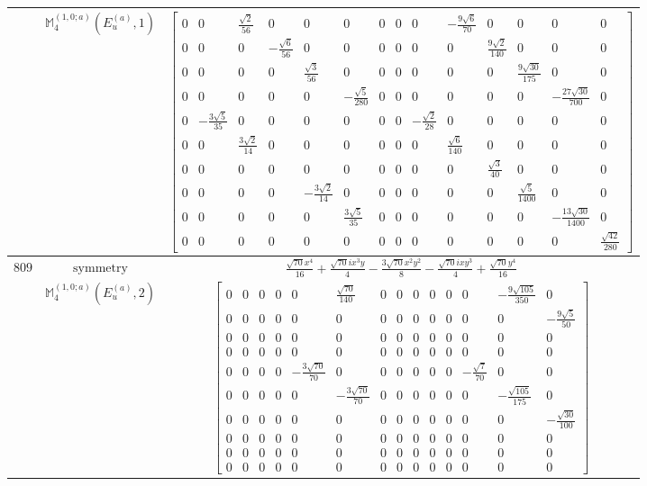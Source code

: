 \documentclass[fleqn,8pt,landscape]{jsarticle}
\begin{document}
\begin{longtable}{ccc}
$  $ & $ \mathbb{M}_{4}^{(1,0;a)}(E_{u}^{(a)},1) $ & $ \begin{bmatrix} 0 & 0 & \frac{\sqrt{2}}{56} & 0 & 0 & 0 & 0 & 0 & 0 & - \frac{9 \sqrt{6}}{70} & 0 & 0 & 0 & 0 \\ 0 & 0 & 0 & - \frac{\sqrt{6}}{56} & 0 & 0 & 0 & 0 & 0 & 0 & \frac{9 \sqrt{2}}{140} & 0 & 0 & 0 \\ 0 & 0 & 0 & 0 & \frac{\sqrt{3}}{56} & 0 & 0 & 0 & 0 & 0 & 0 & \frac{9 \sqrt{30}}{175} & 0 & 0 \\ 0 & 0 & 0 & 0 & 0 & - \frac{\sqrt{5}}{280} & 0 & 0 & 0 & 0 & 0 & 0 & - \frac{27 \sqrt{30}}{700} & 0 \\ 0 & - \frac{3 \sqrt{5}}{35} & 0 & 0 & 0 & 0 & 0 & 0 & - \frac{\sqrt{2}}{28} & 0 & 0 & 0 & 0 & 0 \\ 0 & 0 & \frac{3 \sqrt{2}}{14} & 0 & 0 & 0 & 0 & 0 & 0 & \frac{\sqrt{6}}{140} & 0 & 0 & 0 & 0 \\ 0 & 0 & 0 & 0 & 0 & 0 & 0 & 0 & 0 & 0 & \frac{\sqrt{3}}{40} & 0 & 0 & 0 \\ 0 & 0 & 0 & 0 & - \frac{3 \sqrt{2}}{14} & 0 & 0 & 0 & 0 & 0 & 0 & \frac{\sqrt{5}}{1400} & 0 & 0 \\ 0 & 0 & 0 & 0 & 0 & \frac{3 \sqrt{5}}{35} & 0 & 0 & 0 & 0 & 0 & 0 & - \frac{13 \sqrt{30}}{1400} & 0 \\ 0 & 0 & 0 & 0 & 0 & 0 & 0 & 0 & 0 & 0 & 0 & 0 & 0 & \frac{\sqrt{42}}{280} \end{bmatrix} $ \\ \hline
$ 809 $ & $ \text{symmetry} $ & $ \frac{\sqrt{70} x^{4}}{16} + \frac{\sqrt{70} i x^{3} y}{4} - \frac{3 \sqrt{70} x^{2} y^{2}}{8} - \frac{\sqrt{70} i x y^{3}}{4} + \frac{\sqrt{70} y^{4}}{16} $ \\
$  $ & $ \mathbb{M}_{4}^{(1,0;a)}(E_{u}^{(a)},2) $ & $ \begin{bmatrix} 0 & 0 & 0 & 0 & 0 & \frac{\sqrt{70}}{140} & 0 & 0 & 0 & 0 & 0 & 0 & - \frac{9 \sqrt{105}}{350} & 0 \\ 0 & 0 & 0 & 0 & 0 & 0 & 0 & 0 & 0 & 0 & 0 & 0 & 0 & - \frac{9 \sqrt{5}}{50} \\ 0 & 0 & 0 & 0 & 0 & 0 & 0 & 0 & 0 & 0 & 0 & 0 & 0 & 0 \\ 0 & 0 & 0 & 0 & 0 & 0 & 0 & 0 & 0 & 0 & 0 & 0 & 0 & 0 \\ 0 & 0 & 0 & 0 & - \frac{3 \sqrt{70}}{70} & 0 & 0 & 0 & 0 & 0 & 0 & - \frac{\sqrt{7}}{70} & 0 & 0 \\ 0 & 0 & 0 & 0 & 0 & - \frac{3 \sqrt{70}}{70} & 0 & 0 & 0 & 0 & 0 & 0 & - \frac{\sqrt{105}}{175} & 0 \\ 0 & 0 & 0 & 0 & 0 & 0 & 0 & 0 & 0 & 0 & 0 & 0 & 0 & - \frac{\sqrt{30}}{100} \\ 0 & 0 & 0 & 0 & 0 & 0 & 0 & 0 & 0 & 0 & 0 & 0 & 0 & 0 \\ 0 & 0 & 0 & 0 & 0 & 0 & 0 & 0 & 0 & 0 & 0 & 0 & 0 & 0 \\ 0 & 0 & 0 & 0 & 0 & 0 & 0 & 0 & 0 & 0 & 0 & 0 & 0 & 0 \end{bmatrix} $ \\ \hline

\end{longtable}
\end{document}
